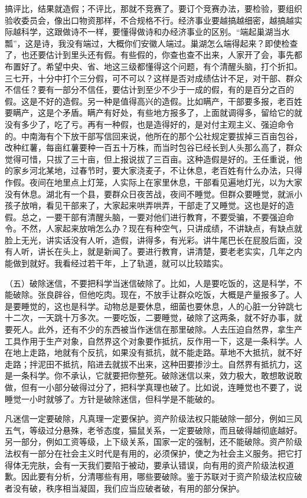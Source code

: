搞评比，结果就造假；不评比，那就不竞赛了。要订个竞赛办法，要检验，要组织验收委员会，像出口物资那样，不合规格不行。经济事业要越搞越细密，越搞越实际越科学，这跟做诗不一样，要懂得做诗和办经济事业的区别。“端起巢湖当水瓢”，这是诗，我没有端过，大概你们安徽人端过。巢湖怎么端得起来？即使检查了，也还要估计到里头还有假。有些假的，你查也查不出来，人家开了会，事先都布置好了。希望中央、省、地这三级都懂得这个问题，有个清醒头脑，打个折扣。三七开，十分中打个三分假，可不可以？这样是否对成绩估计不足，对干部、群众不信任？要有一部分不信任，要估计到至少不少于一成的假，有的是百分之百的假。这是不好的造假。另一种是值得高兴的造假。比如瞒产，干部要多报，老百姓要瞒产，这是个矛盾。瞒产有好处，有些地方报多了，上面就调得多，留给它的就没有多少了，吃了亏。再有一种假，也是造得好的，是对付主观主义、强迫命令的。中南海有个下放干部写信回来说，他所在的那个公社规定要拔掉三百亩包谷，改种红薯，每亩红薯要种一百五十万株，而当时包谷已经长到人头那么高了，群众觉得可惜，只拔了三十亩，但上报说拔了三百亩。这种造假是好的。王任重说，他的家乡河北某地，过春节时，要大家浇麦子，不让休息，老百姓有什么办法，只得作假。夜间在地里点上灯笼，人实际上在家里休息，干部看见遍地灯光，以为大家没有休息。湖北有一个县，要群众日夜苦战，夜间不睡觉。但群众要睡觉，就派小孩子放哨，看见干部来了，大家起来哄弄哄弄，干部走了又睡觉。这也是好的造假。总之，一要干部有清醒头脑，一要对他们进行教育，不要受骗，不要强迫命令。不然，人家起来放哨怎么办？现在有种空气，只讲成绩，不讲缺点，有缺点就脸上无光，讲实话没有人听，造假，讲得多，有光彩。讲牛尾巴长在屁股后面，没有人听，讲长在头上，就是新闻了。要进行教育，讲清楚，要老老实实，几年之内能做到就好。我看经过若干年，上了轨道，就可以比较踏实。

（五）破除迷信，不要把科学当迷信破除了。比如，人是要吃饭的，这是科学，不能破除。张良辟谷，但他吃肉。现在，不放手让群众吃饭，大概是产量报多了。人是要睡觉的，这也是科学。动物总是要休息，细菌也要休息，人的心脏一分钟跳七十二次，一天跳十万多次。一要吃饭，二要睡觉，破除了这两条，就不好办事，就要死人。此外，还有不少的东西被当作迷信在那里破除。人去压迫自然界，拿生产工具作用于生产对象，自然界这个对象要作抵抗，反作用一下，这是一条科学。人在地上走路，地就有个反抗，如果没有抵抗，就不能走路。草地不大抵抗，就不好走路；拌泥田不抵抗，陷进去就拔不出来，这种田要掺沙土。自然界有抵抗力，这是一条科学。你不承认，它就要把你整死。破除迷信以来，效力极大，敢想敢说敢做，但有一小部分破得过分了，把科学真理也破了。比如说，连睡觉也不要了，说睡觉一小时就够了。方针是破除迷信，但科学是不能破的。

凡迷信一定要破除，凡真理一定要保护。资产阶级法权只能破除一部分，例如三风五气，等级过分悬殊，老爷态度，猫鼠关系，一定要破除，而且破得越彻底越好。另一部分，例如工资等级，上下级关系，国家一定的强制，还不能破除。资产阶级法权有一部分在社会主义时代是有用的，必须保护，使之为社会主义服务。把它打得体无完肤，会有一天我们要陷于被动，要承认错误，向有用的资产阶级法权道歉。因此要有分析，分清哪些有用，哪些要破除。鉴于苏联对于资产阶级法权应破者没有破，秩序相当凝固，我们应当应破者破，有用的部分保护。

